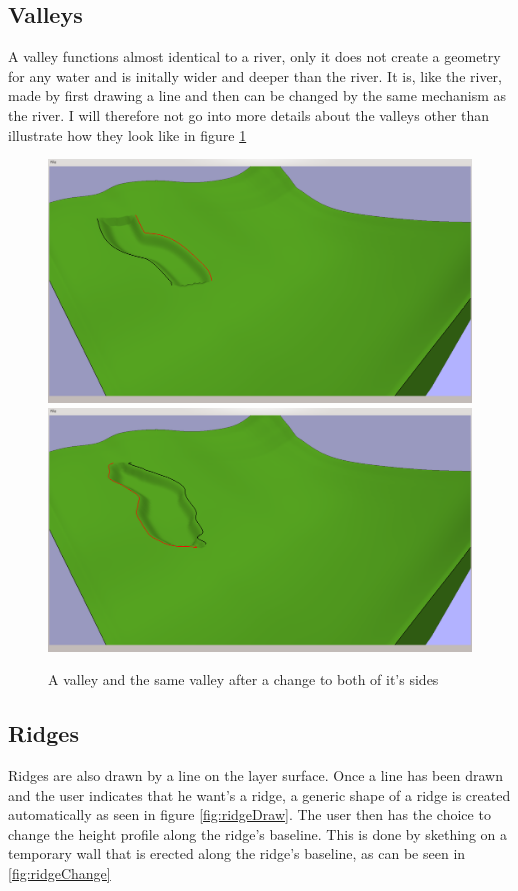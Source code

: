 \documentclass[a4paper,12pt]{report}
\begin{document}
\subsection{Valleys}
A valley functions almost identical to a river, only it does not create a geometry for any water and is initally wider and deeper than the river. It is, like the river, made by first drawing a line and then can be changed by the same mechanism as the river. I will therefore not go into more details about the valleys other than illustrate how they look like in figure \ref{fig:valley}
\begin{figure}
\includegraphics[trim = 10mm 80mm 200mm 30mm, clip,width=.5\linewidth]{thesis/results/valleyMade.png}
\includegraphics[trim = 10mm 80mm 200mm 30mm, clip,width=.5\linewidth]{thesis/results/valleyChanged.png}
 \caption{A valley and the same valley after a change to both of it's sides }
 \label{fig:valley}
\end{figure}

\subsection{Ridges}
Ridges are also drawn by a line on the layer surface. Once a line has been drawn and the user indicates that he want's a ridge, a generic shape of a ridge is created automatically as seen in figure \ref{fig:ridgeDraw}. The user then has the choice to change the height profile along the ridge's baseline. This is done by skething on a temporary wall that is erected along the ridge's baseline, as can be seen in \ref{fig:ridgeChange}
\end{document}
